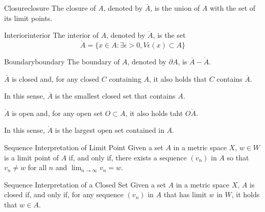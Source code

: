 
\begin{defn}{Closure}{closure}
	The closure of \(A\), denoted by \(\overline A\), is the union of \(A\) with the set of its limit points.
\end{defn}

\begin{defn}{Interior}{interior}
	The interior of \(A\), denoted by \(\mathring A\), is the set  \[
		\mathring A = \{x \in A : \exists \epsilon>0,  V\epsilon(x) \subset A \}
	\]
\end{defn}

\begin{defn}{Boundary}{boundary}
	The boundary of \(A\), denoted by \(\partial A\), is \(\overline A - \mathring A\).
\end{defn}

\begin{prop}{}{}
	\(\overline A\) is closed and, for any closed \(C\) containing \(A\), it also holds that \(C\) contains \(\overline A\).

	In this sense, \(\overline A\) is the smallest closed set that contains \(A\).
\end{prop}

\begin{prop}{}{}
	\(\mathring A\) is open and, for any open set \(O \subset A\), it also holds taht \(O \mathring A\).

	In this sense, \(\mathring A\) is the largest open set contained in \(A\).
\end{prop}

\begin{thm}{Sequence Interpretation of Limit Point}{}
	Given a set \(A\) in a metric space \(X\), \(w \in W\) is a limit point of \(A\) if, and only if, there exists a sequence \((v_n)\) in \(A\) so that \(v_n \neq w\) for all \(n\) and \(\lim_{n\to\infty} v_n = w\).
\end{thm}

\begin{thm}{Sequence Interpretation of a Closed Set}{}
	Given a set \(A\) in a metric space \(X\), \(A\) is closed if, and only if, for any sequence \((v_n)\) in \(A\) that has limit \(w\) in \(W\), it holds that \(w \in A\).
\end{thm}
